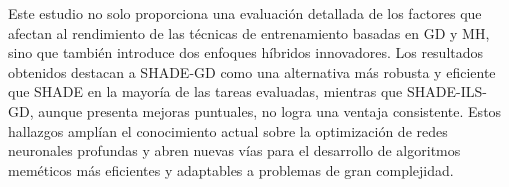 Este estudio no solo proporciona una evaluación detallada de los factores que afectan al rendimiento de las técnicas de entrenamiento basadas en GD y MH, sino que también introduce dos enfoques híbridos innovadores. Los resultados obtenidos destacan a SHADE-GD como una alternativa más robusta y eficiente que SHADE en la mayoría de las tareas evaluadas, mientras que SHADE-ILS-GD, aunque presenta mejoras puntuales, no logra una ventaja consistente. Estos hallazgos amplían el conocimiento actual sobre la optimización de redes neuronales profundas y abren nuevas vías para el desarrollo de algoritmos meméticos más eficientes y adaptables a problemas de gran complejidad.